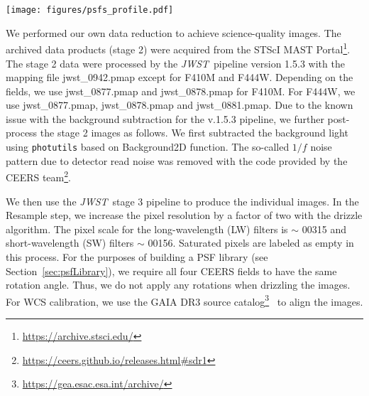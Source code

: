 \documentclass[twocolumn,]{aastex631}
\newcommand{\jwst}{{\it JWST}}
\begin{document}
\begin{figure*}
\centering
\texttt{[image: figures/psfs\_profile.pdf]}
\caption{Surface brightness (SB) profiles (annuli) of nine select PSFs are shown as a function of radius (based on stars detected by \jwst) per filter and compared with the simulated PSF model from \texttt{webbpsf}. The vertical lines indicate the FWHM values of the PSF-stars (averaged) and PSF model by \texttt{webbpsf}. We only show the inner regions ($<7$ pixels) of these profiles which are key for quasar subtraction. The PSFs in our library demonstrate very stable performance, while the simulated PSF models by \jwst\ are too narrow (i.e., peaking at the center) for all the filters.
\label{fig:PSFprofile}}
\end{figure*}

 We performed our own data reduction to achieve science-quality images. The archived data products (stage 2) were acquired from the STScI MAST Portal\footnote{\url{https://archive.stsci.edu/}}. The stage 2 data were processed by the \jwst\ pipeline version 1.5.3 with the mapping file \textsf{jwst\_0942.pmap} except for F410M and F444W. Depending on the fields, we use \textsf{jwst\_0877.pmap} and \textsf{jwst\_0878.pmap} for F410M. For F444W, we use \textsf{jwst\_0877.pmap}, \textsf{jwst\_0878.pmap} and \textsf{jwst\_0881.pmap}. Due to the known issue with the background subtraction for the v.1.5.3 pipeline, we further post-process the stage 2 images as follows. We first subtracted the background light using \texttt{photutils} based on \textsf{Background2D} function. 
 The so-called $1/f$ noise pattern due to detector read noise was removed with the code provided by the CEERS team\footnote{\url{https://ceers.github.io/releases.html\#sdr1}}. 

We then use the \jwst\ stage 3 pipeline to produce the individual images. In the  \textsf{Resample} step, we increase the pixel resolution by a factor of two with the drizzle algorithm. The pixel scale for the long-wavelength (LW) filters is $\sim$ 0\farcs{}0315 and short-wavelength (SW) filters $\sim$ 0\farcs{}0156. Saturated pixels are labeled as empty in this process. For the purposes of building a PSF library (see Section~\ref{sec:psfLibrary}), we require all four CEERS fields to have the same rotation angle. Thus, we do not apply any rotations when drizzling the images. For WCS calibration, we use the GAIA DR3 source catalog\footnote{\url{https://gea.esac.esa.int/archive/}}~\citep{GAIA16} to align the images. 
\end{document}
